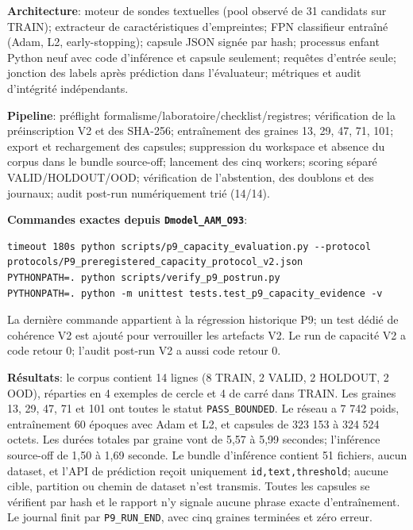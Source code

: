 \documentclass[11pt,a4paper,oneside]{report}
\begin{document}
\textbf{Architecture}: moteur de sondes textuelles (pool observé de 31 candidats sur TRAIN); extracteur de caractéristiques d'empreintes; FPN classifieur entraîné (Adam, L2, early-stopping); capsule JSON signée par hash; processus enfant Python neuf avec code d'inférence et capsule seulement; requêtes d'entrée seule; jonction des labels après prédiction dans l'évaluateur; métriques et audit d'intégrité indépendants.

\textbf{Pipeline}: préflight formalisme/laboratoire/checklist/registres; vérification de la préinscription V2 et des SHA-256; entraînement des graines 13, 29, 47, 71, 101; export et rechargement des capsules; suppression du workspace et absence du corpus dans le bundle source-off; lancement des cinq workers; scoring séparé VALID/HOLDOUT/OOD; vérification de l'abstention, des doublons et des journaux; audit post-run numériquement trié (14/14).

\textbf{Commandes exactes depuis \texttt{Dmodel\_AAM\_O93}}:
\begin{lstlisting}[basicstyle=\ttfamily\small,breaklines=true]
timeout 180s python scripts/p9_capacity_evaluation.py --protocol protocols/P9_preregistered_capacity_protocol_v2.json
PYTHONPATH=. python scripts/verify_p9_postrun.py
PYTHONPATH=. python -m unittest tests.test_p9_capacity_evidence -v
\end{lstlisting}
La dernière commande appartient à la régression historique P9; un test dédié de cohérence V2 est ajouté pour verrouiller les artefacts V2. Le run de capacité V2 a code retour 0; l'audit post-run V2 a aussi code retour 0.

\textbf{Résultats}: le corpus contient 14 lignes (8 TRAIN, 2 VALID, 2 HOLDOUT, 2 OOD), réparties en 4 exemples de cercle et 4 de carré dans TRAIN. Les graines 13, 29, 47, 71 et 101 ont toutes le statut \texttt{PASS\_BOUNDED}. Le réseau a 7 742 poids, entraînement 60 époques avec Adam et L2, et capsules de 323 153 à 324 524 octets. Les durées totales par graine vont de 5,57 à 5,99 secondes; l'inférence source-off de 1,50 à 1,69 seconde. Le bundle d'inférence contient 51 fichiers, aucun dataset, et l'API de prédiction reçoit uniquement \texttt{id,text,threshold}; aucune cible, partition ou chemin de dataset n'est transmis. Toutes les capsules se vérifient par hash et le rapport n'y signale aucune phrase exacte d'entraînement. Le journal finit par \texttt{P9\_RUN\_END}, avec cinq graines terminées et zéro erreur.
\end{document}
